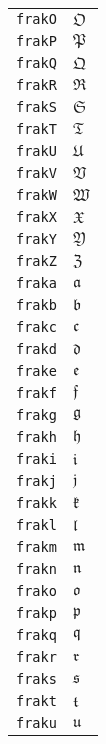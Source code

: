 \begin{longtable}{ll}
\texttt{frakO}&${}{\mathfrak{O}} {}$\\
\texttt{frakP}&${}{\mathfrak{P}} {}$\\
\texttt{frakQ}&${}{\mathfrak{Q}} {}$\\
\texttt{frakR}&${}{\mathfrak{R}} {}$\\
\texttt{frakS}&${}{\mathfrak{S}} {}$\\
\texttt{frakT}&${}{\mathfrak{T}} {}$\\
\texttt{frakU}&${}{\mathfrak{U}} {}$\\
\texttt{frakV}&${}{\mathfrak{V}} {}$\\
\texttt{frakW}&${}{\mathfrak{W}} {}$\\
\texttt{frakX}&${}{\mathfrak{X}} {}$\\
\texttt{frakY}&${}{\mathfrak{Y}} {}$\\
\texttt{frakZ}&${}{\mathfrak{Z}} {}$\\
\texttt{fraka}&${}{\mathfrak{a}} {}$\\
\texttt{frakb}&${}{\mathfrak{b}} {}$\\
\texttt{frakc}&${}{\mathfrak{c}} {}$\\
\texttt{frakd}&${}{\mathfrak{d}} {}$\\
\texttt{frake}&${}{\mathfrak{e}} {}$\\
\texttt{frakf}&${}{\mathfrak{f}} {}$\\
\texttt{frakg}&${}{\mathfrak{g}} {}$\\
\texttt{frakh}&${}{\mathfrak{h}} {}$\\
\texttt{fraki}&${}{\mathfrak{i}} {}$\\
\texttt{frakj}&${}{\mathfrak{j}} {}$\\
\texttt{frakk}&${}{\mathfrak{k}} {}$\\
\texttt{frakl}&${}{\mathfrak{l}} {}$\\
\texttt{frakm}&${}{\mathfrak{m}} {}$\\
\texttt{frakn}&${}{\mathfrak{n}} {}$\\
\texttt{frako}&${}{\mathfrak{o}} {}$\\
\texttt{frakp}&${}{\mathfrak{p}} {}$\\
\texttt{frakq}&${}{\mathfrak{q}} {}$\\
\texttt{frakr}&${}{\mathfrak{r}} {}$\\
\texttt{fraks}&${}{\mathfrak{s}} {}$\\
\texttt{frakt}&${}{\mathfrak{t}} {}$\\
\texttt{fraku}&${}{\mathfrak{u}} {}$\\

\end{longtable}
